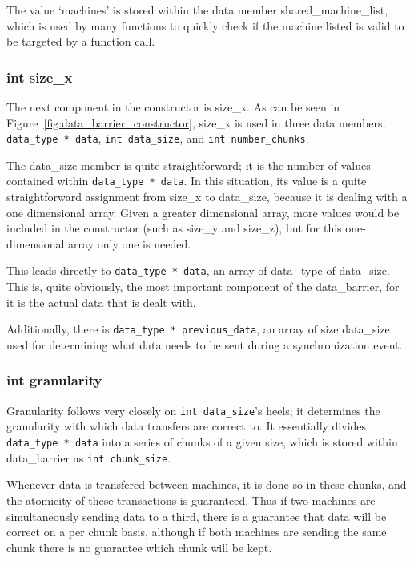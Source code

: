 \documentclass[../thesis.tex]{subfiles}
\begin{document}
    The value `machines' is stored within the data member shared\_machine\_list, which is used by many functions to quickly check if the machine listed is valid to be targeted by a function call.

  \subsubsection{int size\_x} %
  \label{ssub:int_size_x}
      The next component in the constructor is size\_x. As can be seen in Figure~\ref{fig:data_barrier_constructor}, size\_x is used in three data members; \texttt{data\_type * data}, \texttt{int data\_size}, and \texttt{int number\_chunks}.

      The data\_size member is quite straightforward; it is the number of values contained within \texttt{data\_type * data}. In this situation, its value is a quite straightforward assignment from size\_x to data\_size, because it is dealing with a one dimensional array. Given a greater dimensional array, more values would be included in the constructor (such as size\_y and size\_z), but for this one-dimensional array only one is needed.

      This leads directly to \texttt{data\_type * data}, an array of data\_type of data\_size. This is, quite obviously, the most important component of the data\_barrier, for it is the actual data that is dealt with.

      Additionally, there is \texttt{data\_type * previous\_data}, an array of size data\_size used for determining what data needs to be sent during a synchronization event.

  \subsubsection{int granularity} %
  \label{ssub:int_granularity}
    Granularity follows very closely on \texttt{int data\_size}'s heels; it determines the granularity with which data transfers are correct to. It essentially divides \texttt{data\_type * data} into a series of chunks of a given size, which is stored within data\_barrier as \texttt{int chunk\_size}.

    Whenever data is transfered between machines, it is done so in these chunks, and the atomicity of these transactions is guaranteed. Thus if two machines are simultaneously sending data to a third, there is a guarantee that data will be correct on a per chunk basis, although if both machines are sending the same chunk there is no guarantee which chunk will be kept.
\end{document}
